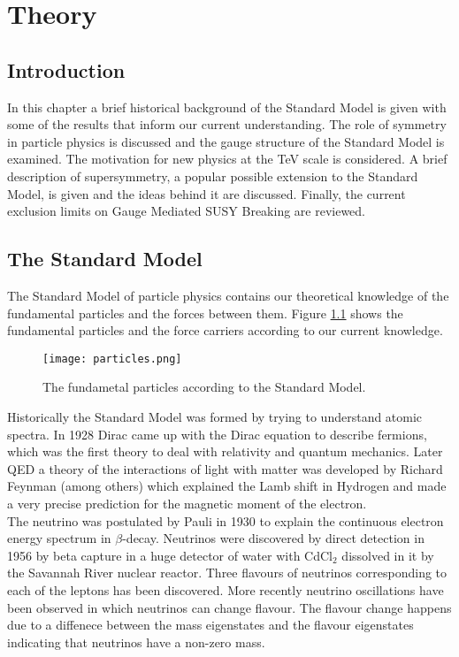 \chapter{Theory}

\section{Introduction}

In this chapter a brief historical background of the Standard Model is given
with some of the results that inform our current understanding. The role of
symmetry in particle physics is discussed and the gauge structure of the
Standard Model is examined. The motivation for new physics at the TeV scale is
considered. A brief description of supersymmetry, a popular possible extension 
to the Standard Model, is given and the ideas behind it are discussed. Finally,
the current exclusion limits on Gauge Mediated SUSY Breaking are reviewed. 

\section{The Standard Model}

The Standard Model of particle physics contains our theoretical knowledge of the
fundamental particles and the forces between them. Figure \ref{fig:particles}
shows the fundamental particles and the force carriers according to our current
knowledge. \\

\begin{figure}
\begin{center}
\texttt{[image: particles.png]}
\end{center}
\caption{The fundametal particles according to the Standard Model.}
\label{fig:particles}
\end{figure}

Historically the Standard Model was formed by trying to understand atomic
spectra. In 1928 Dirac came up with the Dirac equation to describe fermions, 
which was the first theory to deal with relativity and quantum mechanics. Later 
QED a theory of the interactions of light with matter was developed by Richard 
Feynman (among others) which explained the Lamb shift in Hydrogen and made a 
very precise prediction for the magnetic moment of the electron. \\

The neutrino was postulated by Pauli in 1930 to explain the continuous electron 
energy spectrum in $\beta$-decay. Neutrinos were discovered by direct detection 
in 1956 by beta capture in a huge detector of water with CdCl$_{2}$ dissolved in
it by the Savannah River nuclear reactor. Three flavours of neutrinos 
corresponding to each of the leptons has been discovered. More recently neutrino 
oscillations have been observed in which neutrinos can change flavour. The 
flavour change happens due to a diffenece between the mass eigenstates and the 
flavour eigenstates indicating that neutrinos have a non-zero mass. \\

